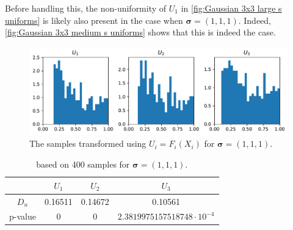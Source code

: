 \documentclass[../Thesis.tex]{subfiles}
\begin{document}



Before handling this, the non-uniformity of $U_1$ in \autoref{fig:Gaussian 3x3 large s uniforms} is likely also present in the case when $\boldsymbol\sigma = (1,1,1)$. Indeed, \autoref{fig:Gaussian 3x3 medium s uniforms} shows that this is indeed the case.
\begin{figure}[H]
    \centering
    \includegraphics[width=0.99\linewidth]{figures/ND examples/Gaussian 3x3 medium s uniforms.pdf}
    \caption{The samples transformed using $U_i = F_i(X_i)$ for $\boldsymbol\sigma = (1,1,1)$.}
    \label{fig:Gaussian 3x3 medium s uniforms}
\end{figure}
\begin{table}[ht]
    \centering
    \begin{tabular}{c|c|c|c}
                & $U_1$   & $U_2$   & $U_3$                              \\\hline
        $D_n$   & 0.16511 & 0.14672 & 0.10561                            \\
        p-value & 0       & 0       & $2.3819975157518748 \cdot 10^{-4}$
    \end{tabular}
    \caption{based on 400 samples for $\boldsymbol\sigma = (1, 1, 1)$.}
\end{table}



\end{document}
